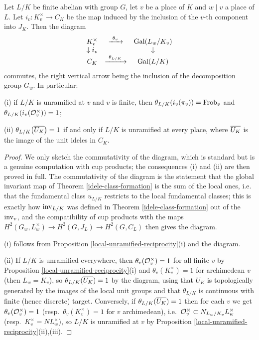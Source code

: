 \begin{thm}
\label{reciprocity-local-compatibility}
Let $L/K$ be finite abelian with group $G$, let $v$ be a place of $K$ and
$w\mid v$ a place of $L$.
Let $i_v:K_v^\times\to C_K$ be the map induced by the inclusion of the $v$-th
component into $J_K$. Then the diagram
$$\begin{array}{ccc}
K_v^\times&\xrightarrow{\ \theta_v\ }&{\mathrm{Gal}}(L_w/K_v)\\
\downarrow i_v&&\downarrow\\
C_K&\xrightarrow{\ \theta_{L/K}\ }&{\mathrm{Gal}}(L/K)
\end{array}$$
commutes, the right vertical arrow being the inclusion of the decomposition
group $G_w$.
In particular:

{\rm(i)} if $L/K$ is unramified at $v$ and $v$ is finite, then
$\theta_{L/K}(i_v(\pi_v))={\mathrm{Frob}}_v$ and $\theta_{L/K}(i_v({\mathcal {O}}_v^\times))=1$;

{\rm(ii)} $\theta_{L/K}\big(\overline{U_K}\big)=1$ if and only if $L/K$ is unramified
at every place, where $\overline{U_K}$ is the image of the unit ideles in $C_K$.
\end{thm}

\begin{proof}
We only sketch the commutativity of the diagram, which is standard but is a
genuine computation with cup products; the consequences (i) and (ii) are then
proved in full.
The commutativity of the diagram is the statement that the global invariant map
of Theorem \ref{idele-class-formation} is the sum of the local ones, i.e.
that the fundamental class $u_{L/K}$ restricts to the local fundamental classes;
this is exactly how ${\mathrm{inv}}_{L/K}$ was defined in
Theorem \ref{idele-class-formation} out of the ${\mathrm{inv}}_v$, and the compatibility
of cup products with the maps $H^2(G_w,L_w^\times)\to H^2(G,J_L)\to H^2(G,C_L)$
then gives the diagram.

(i) follows from Proposition \ref{local-unramified-reciprocity}(i) and the
diagram.

(ii) If $L/K$ is unramified everywhere, then $\theta_v({\mathcal {O}}_v^\times)=1$ for all
finite $v$ by Proposition \ref{local-unramified-reciprocity}(i) and
$\theta_v(K_v^\times)=1$ for archimedean $v$ (then $L_w=K_v$), so
$\theta_{L/K}(\overline{U_K})=1$ by the diagram, using that $U_K$ is topologically
generated by the images of the local unit groups and that $\theta_{L/K}$ is
continuous with finite (hence discrete) target.
Conversely, if $\theta_{L/K}(\overline{U_K})=1$ then for each $v$ we get
$\theta_v({\mathcal {O}}_v^\times)=1$ (resp.~$\theta_v(K_v^\times)=1$ for $v$ archimedean),
i.e.~${\mathcal {O}}_v^\times\subset N_{L_w/K_v}L_w^\times$ (resp.~$K_v^\times=NL_w^\times$),
so $L/K$ is unramified at $v$ by
Proposition \ref{local-unramified-reciprocity}(ii),(iii).
\end{proof}

